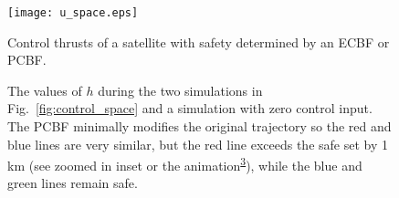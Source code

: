 \documentclass[10pt,conference]{ieeeconf}
\renewcommand{\(}{\left(}
\renewcommand{\)}{\right)}
\renewcommand{\[}{\left[}
\renewcommand{\]}{\right]}
\newcommand{\regularversion}[1]{\iffalse{}#1\fi}
\newcommand{\extendedversion}[1]{{\color{black}#1}}
\begin{document}
\begin{figure}
    \centering
    \texttt{[image: u\_space.eps]}
    \caption{Control thrusts of a satellite with safety determined by an ECBF or PCBF.}
    \label{fig:control_space}
% 
\regularversion{\vspace{10pt}}\extendedversion{\vspace{7pt}}
    \centering
    \caption{The values of $h$ during the two simulations in Fig.~\ref{fig:control_space} and a simulation with zero control input. The PCBF minimally modifies the original trajectory so the red and blue lines are very similar, but the red line exceeds the safe set by 1 km (see zoomed in inset {or the animation\textsuperscript{\protect\hyperlink{note:satellite}{3}}}), while {the} blue and green lines remain safe.}
    \label{fig:safety_space}
    \vspace{-12pt}
\end{figure}
\end{document}
